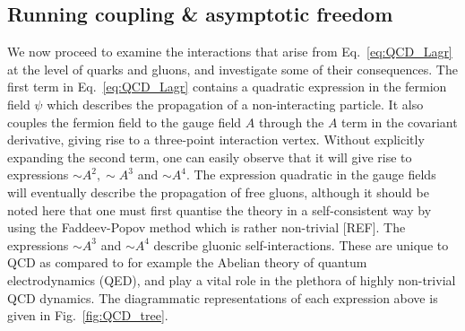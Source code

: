 \documentclass[12pt, a4paper, twoside]{book}
\begin{document}
\subsection{Running coupling \& asymptotic freedom}
\label{sec:QCD_run_free}
We now proceed to examine the interactions that arise from Eq.~\eqref{eq:QCD_Lagr} at the level of quarks and gluons, and investigate some of their consequences. The first term in Eq.~\eqref{eq:QCD_Lagr} contains a quadratic expression in the fermion field \(\psi\) which describes the propagation of a non-interacting particle. It also couples the fermion field to the gauge field \(A\) through the \(A\) term in the covariant derivative, giving rise to a three-point interaction vertex. Without explicitly expanding the second term, one can easily observe that it will give rise to expressions \(\sim\!A^2, \sim\!A^3\) and \(\sim\!A^4\). The expression quadratic in the gauge fields will eventually describe the propagation of free gluons, although it should be noted here that one must first quantise the theory in a self-consistent way by using the Faddeev-Popov method which is rather non-trivial [REF]. The expressions \(\sim\!A^3\) and \(\sim\!A^4\) describe gluonic self-interactions. These are unique to QCD as compared to for example the Abelian theory of quantum electrodynamics (QED), and play a vital role in the plethora of highly non-trivial QCD dynamics. The diagrammatic representations of each expression above is given in Fig.~\ref{fig:QCD_tree}. 
\end{document}
